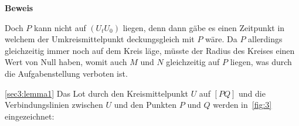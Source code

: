 \documentclass[10pt, a4paper, reqno]{amsart}
\makeatletter
\renewcommand\proofname{Beweis}
\renewenvironment{proof}[1][\proofname]{\par
\pushQED{\qed}%
\normalfont \topsep6\p@\@plus6\p@\relax
\trivlist
\item\relax
{\bfseries#1}\hspace\labelsep\ignorespaces
}{%
\popQED\endtrivlist\@endpefalse
}
\newenvironment{proof_thm}[1]{
\begin{proof}[\proofname~(#1)]}{\end{proof}}
\makeatother
\begin{document}
\begin{proof}
  Doch $P$ kann nicht auf $(U_tU_0)$ liegen, denn dann gäbe es
  einen Zeitpunkt in welchem der Umkreismittelpunkt deckungsgleich mit $P$ wäre.
  Da $P$ allerdings gleichzeitig immer noch auf dem Kreis läge, müsste der
  Radius des Kreises einen Wert von Null haben, womit auch $M$ und $N$
  gleichzeitig auf $P$ liegen, was durch die Aufgabenstellung verboten ist.
\end{proof}
\begin{proof_thm}{\autoref{sec3:lemma1}}
  Das Lot durch den Kreismittelpunkt $U$ auf $[PQ]$ und die Verbindungslinien
  zwischen $U$ und den Punkten $P$ und $Q$ werden
  in~\autoref{fig:3} eingezeichnet:
  
  \begin{figure}[h]
    \centering
\end{figure}
\end{proof_thm}
\end{document}
